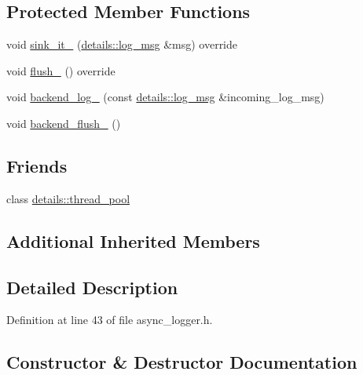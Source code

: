 \subsection*{Protected Member Functions}
\begin{DoxyCompactItemize}
\item 
void \hyperlink{classspdlog_1_1async__logger_aefd367c3266773bfe756d34150705329}{sink\+\_\+it\+\_\+} (\hyperlink{structspdlog_1_1details_1_1log__msg}{details\+::log\+\_\+msg} \&msg) override
\item 
void \hyperlink{classspdlog_1_1async__logger_ae7eeca32af4d650bc1e2dd06122d0224}{flush\+\_\+} () override
\item 
void \hyperlink{classspdlog_1_1async__logger_a50a7de9842c326ab5b99cbcc851d9c60}{backend\+\_\+log\+\_\+} (const \hyperlink{structspdlog_1_1details_1_1log__msg}{details\+::log\+\_\+msg} \&incoming\+\_\+log\+\_\+msg)
\item 
void \hyperlink{classspdlog_1_1async__logger_a24a37552c3339c7b129a38a2c4702689}{backend\+\_\+flush\+\_\+} ()
\end{DoxyCompactItemize}
\subsection*{Friends}
\begin{DoxyCompactItemize}
\item 
class \hyperlink{classspdlog_1_1async__logger_a67ce2a7de422d11203d66f1f6da4be03}{details\+::thread\+\_\+pool}
\end{DoxyCompactItemize}
\subsection*{Additional Inherited Members}


\subsection{Detailed Description}


Definition at line 43 of file async\+\_\+logger.\+h.



\subsection{Constructor \& Destructor Documentation}
\mbox{\label{classspdlog_1_1async__logger_a2a74bf8d8d850ea760396ba8ae55d552}} 
